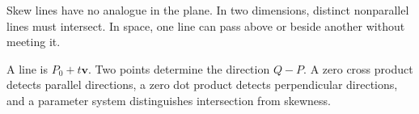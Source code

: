 \begin{interpretationbox}
Skew lines have no analogue in the plane. In two dimensions, distinct
nonparallel lines must intersect. In space, one line can pass above or beside
another without meeting it.
\end{interpretationbox}

\begin{summarybox}
A line is $P_0+t\mathbf v$. Two points determine the direction $Q-P$. A zero
cross product detects parallel directions, a zero dot product detects
perpendicular directions, and a parameter system distinguishes intersection
from skewness.
\end{summarybox}
